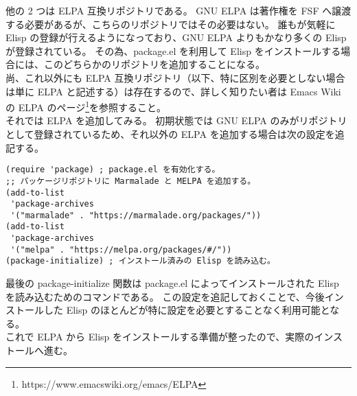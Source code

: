 他の 2 つは ELPA 互換リポジトリである。
GNU ELPA は著作権を FSF へ譲渡する必要があるが、こちらのリポジトリではその必要はない。
誰もが気軽に Elisp の登録が行えるようになっており、GNU ELPA よりもかなり多くの Elisp が登録されている。
その為、package.el を利用して Elisp をインストールする場合には、このどちらかのリポジトリを追加することになる。\\

尚、これ以外にも ELPA 互換リポジトリ（以下、特に区別を必要としない場合は単に ELPA と記述する）は存在するので、詳しく知りたい者は Emacs Wiki の ELPA のページ\footnote{https://www.emacswiki.org/emacs/ELPA}を参照すること。\\

それでは ELPA を追加してみる。
初期状態では GNU ELPA のみがリポジトリとして登録されているため、それ以外の ELPA を追加する場合は次の設定を追記する。
\begin{mdframed}[roundcorner=0.50zw,leftmargin=3.00zw,rightmargin=3.00zw,skipabove=0.40zw,skipbelow=0.40zw,innertopmargin=4.00pt,innerbottommargin=4.00pt,innerleftmargin=5.00pt,innerrightmargin=5.00pt,linecolor=gray!020,linewidth=0.50pt,backgroundcolor=gray!20]
\begin{verbatim}
(require 'package) ; package.el を有効化する。
;; パッケージリポジトリに Marmalade と MELPA を追加する。
(add-to-list
 'package-archives
 '("marmalade" . "https://marmalade.org/packages/"))
(add-to-list
 'package-archives
 '("melpa" . "https://melpa.org/packages/#/"))
(package-initialize) ; インストール済みの Elisp を読み込む。
\end{verbatim}
\end{mdframed}
最後の package-initialize 関数は package.el によってインストールされた Elisp を読み込むためのコマンドである。
この設定を追記しておくことで、今後インストールした Elisp のほとんどが特に設定を必要とすることなく利用可能となる。\\

これで ELPA から Elisp をインストールする準備が整ったので、実際のインストールへ進む。
